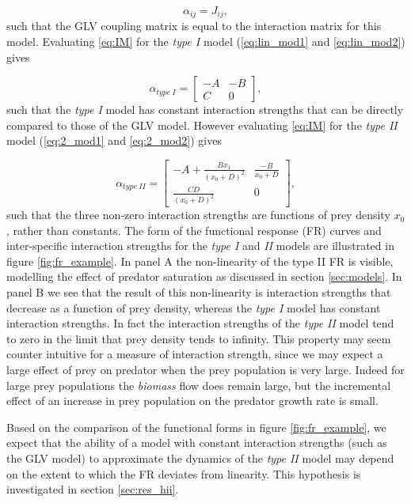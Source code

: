 \begin{equation}
\alpha_{ij} = J_{ij},
\label{eq:alpha_glv}
\end{equation}
% 
such that the GLV coupling matrix is equal to the interaction matrix for this model. Evaluating \eqref{eq:IM} for the \emph{type I} model (\eqref{eq:lin_mod1} and \eqref{eq:lin_mod2}) gives

\begin{equation}
\alpha_{type\ I} = 
\begin{bmatrix}
-A & -B \\ C & 0
\end{bmatrix}  	,
\end{equation}
%
such that the \emph{type I} model has constant interaction strengths that can be directly compared to those of the GLV model. However evaluating \eqref{eq:IM} for the \emph{type II} model (\eqref{eq:2_mod1} and \eqref{eq:2_mod2}) gives

\begin{equation}\label{eq:im_hii}
\alpha_{type\ II} = 
\begin{bmatrix}
-A + \frac{Bx_1}{(x_0 + D)^2} & \frac{-B}{x_0 + D} \\[10pt] \frac{CD}{(x_0 + D)^2} & 0
\end{bmatrix}  	,
\end{equation}
%
such that the three non-zero interaction strengths are functions of prey density $x_0$, rather than constants. The form of the functional response (FR) curves and inter-specific interaction strengths for the \emph{type I} and \emph{II} models are illustrated in figure \ref{fig:fr_example}. In panel A the non-linearity of the type II FR is visible, modelling the effect of predator saturation as discussed in section \ref{sec:models}. In panel B we see that the result of this non-linearity is interaction strengths that decrease as a function of prey density, whereas the \emph{type I} model has constant interaction strengths. In fact the interaction strengths of the \emph{type II} model tend to zero in the limit that prey density tends to infinity. This property may seem counter intuitive for a measure of interaction strength, since we may expect a large effect of prey on predator when the prey population is very large. Indeed for large prey populations the \emph{biomass} flow does remain large, but the incremental effect of an increase in prey population on the predator growth rate is small.

Based on the comparison of the functional forms in figure \ref{fig:fr_example}, we expect that the ability of a model with constant interaction strengths (such as the GLV model) to approximate the dynamics of the \emph{type II} model may depend on the extent to which the FR deviates from linearity. This hypothesis is investigated in section \ref{sec:res_hii}.

